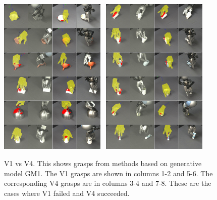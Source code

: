 \begin{figure}
\begin{center}
\includegraphics[width=0.45\textwidth]{plots/A2fA9s_1_vertical.png}~
\includegraphics[width=0.45\textwidth]{plots/A2fA9s_2_vertical.png}
\caption{V1 vs V4. This shows grasps from methods based on generative model GM1. The V1 grasps are shown in columns 1-2 and 5-6. The corresponding V4 grasps are in columns 3-4 and 7-8. These are the cases where V1 failed and V4 succeeded.\label{fig:v1fv4s}}
\end{center}
\end{figure}



